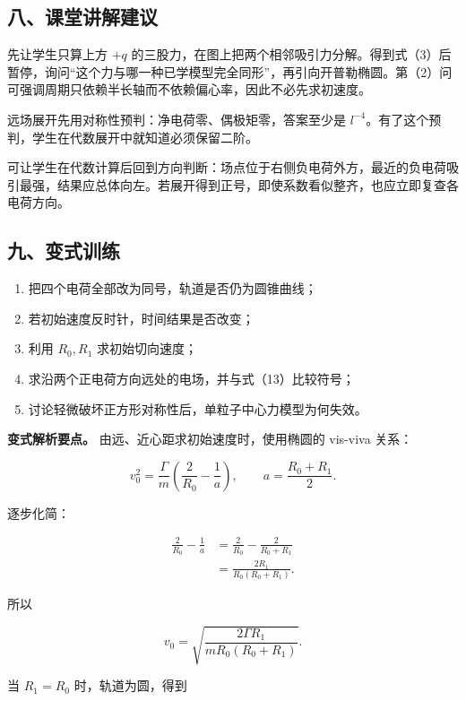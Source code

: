 \documentclass[12pt,a4paper,UTF8]{ctexart}
\newcommand{\tightlist}{\setlength{\itemsep}{0pt}\setlength{\parskip}{0pt}}
\begin{document}
\subsection{八、课堂讲解建议}\label{ux516bux8bfeux5802ux8bb2ux89e3ux5efaux8bae-4}

先让学生只算上方 \(+q\)
的三股力，在图上把两个相邻吸引力分解。得到式（3）后暂停，询问``这个力与哪一种已学模型完全同形''，再引向开普勒椭圆。第（2）问可强调周期只依赖半长轴而不依赖偏心率，因此不必先求初速度。

远场展开先用对称性预判：净电荷零、偶极矩零，答案至少是
\(l^{-4}\)。有了这个预判，学生在代数展开中就知道必须保留二阶。

可让学生在代数计算后回到方向判断：场点位于右侧负电荷外方，最近的负电荷吸引最强，结果应总体向左。若展开得到正号，即使系数看似整齐，也应立即复查各电荷方向。

\subsection{九、变式训练}\label{ux4e5dux53d8ux5f0fux8badux7ec3-4}

\begin{enumerate}
\def\labelenumi{\arabic{enumi}.}
\tightlist
\item
  把四个电荷全部改为同号，轨道是否仍为圆锥曲线；
\item
  若初始速度反时针，时间结果是否改变；
\item
  利用 \(R_0,R_1\) 求初始切向速度；
\item
  求沿两个正电荷方向远处的电场，并与式（13）比较符号；
\item
  讨论轻微破坏正方形对称性后，单粒子中心力模型为何失效。
\end{enumerate}

\textbf{变式解析要点。} 由远、近心距求初始速度时，使用椭圆的 vis-viva
关系：

\[
v_0^2
=\frac{\Gamma}{m}
\left(\frac2{R_0}-\frac1a\right),
\qquad
a=\frac{R_0+R_1}{2}.
\]

逐步化简：

\[
\begin{aligned}
\frac2{R_0}-\frac1a
&=\frac2{R_0}-\frac2{R_0+R_1}\\
&=\frac{2R_1}{R_0(R_0+R_1)}.
\end{aligned}
\]

所以

\[
v_0
=\sqrt{
\frac{2\Gamma R_1}
{mR_0(R_0+R_1)}
}.
\]

当 \(R_1=R_0\) 时，轨道为圆，得到
\end{document}
